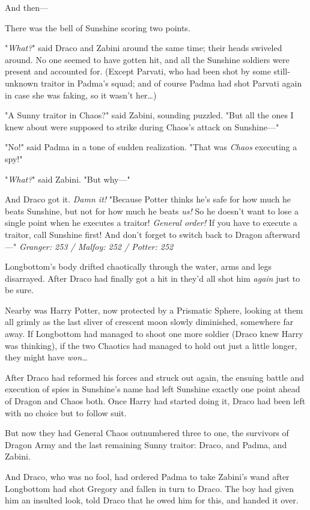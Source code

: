 And then---

There was the bell of Sunshine scoring two points.

"\emph{What?}" said Draco and Zabini around the same time; their heads swiveled
around. No one seemed to have gotten hit, and all the Sunshine soldiers were
present and accounted for. (Except Parvati, who had been shot by some
still-unknown traitor in Padma's squad; and of course Padma had shot Parvati
again in case she was faking, so it wasn't her{\ldots})

"A Sunny traitor in Chaos?" said Zabini, sounding puzzled. "But all the ones I
knew about were supposed to strike during Chaos's attack on Sunshine---"

"No!" said Padma in a tone of sudden realization. "That was \emph{Chaos}
executing a spy!"

"\emph{What?}" said Zabini. "But why---"

And Draco got it. \emph{Damn it!} "Because Potter thinks he's safe for how much
he beats Sunshine, but not for how much he beats \emph{us!} So he doesn't want
to lose a single point when he executes a traitor! \emph{General order!} If you
have to execute a traitor, call Sunshine first! And don't forget to switch back
to Dragon afterward---"
\later
\emph{Granger: 253 / Malfoy: 252 / Potter: 252}

Longbottom's body drifted chaotically through the water, arms and legs
disarrayed. After Draco had finally got a hit in they'd all shot him
\emph{again} just to be sure.

Nearby was Harry Potter, now protected by a Prismatic Sphere, looking at them
all grimly as the last sliver of crescent moon slowly diminished, somewhere far
away. If Longbottom had managed to shoot one more soldier (Draco knew Harry was
thinking), if the two Chaotics had managed to hold out just a little longer,
they might have \emph{won}{\ldots}

After Draco had reformed his forces and struck out again, the ensuing battle
and execution of spies in Sunshine's name had left Sunshine exactly one point
ahead of Dragon and Chaos both. Once Harry had started doing it, Draco had been
left with no choice but to follow suit.

But now they had General Chaos outnumbered three to one, the survivors of
Dragon Army and the last remaining Sunny traitor: Draco, and Padma, and Zabini.

And Draco, who was no fool, had ordered Padma to take Zabini's wand after
Longbottom had shot Gregory and fallen in turn to Draco. The boy had given him
an insulted look, told Draco that he owed him for this, and handed it over.

